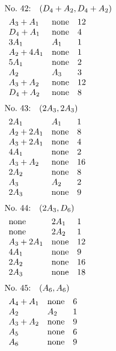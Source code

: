 %
%
\begin{align*}
&\hbox to 4cm {\textrm{No.~42:}\quad$(D_{4}+A_{2}, D_{4}+A_{2})$\hss}\\ 
&\begin{array}{lll}
A_{3}+A_{1} & \none & 12\\
D_{4}+A_{1} & \none & 4\\
3A_{1} & A_{1} & 1\\
A_{2}+4A_{1} & \none & 1\\
5A_{1} & \none & 2\\
A_{2} & A_{3} & 3\\
A_{3}+A_{2} & \none & 12\\
D_{4}+A_{2} & \none & 8\\
\end{array}
\end{align*}
%
%
\begin{align*}
&\hbox to 4cm {\textrm{No.~43:}\quad$(2A_{3}, 2A_{3})$\hss}\\ 
&\begin{array}{lll}
2A_{1} & A_{1} & 1\\
A_{2}+2A_{1} & \none & 8\\
A_{3}+2A_{1} & \none & 4\\
4A_{1} & \none & 2\\
A_{3}+A_{2} & \none & 16\\
2A_{2} & \none & 8\\
A_{3} & A_{2} & 2\\
2A_{3} & \none & 9\\
\end{array}
\end{align*}
%
%
\begin{align*}
&\hbox to 4cm {\textrm{No.~44:}\quad$(2A_{3}, D_{6})$\hss}\\ 
&\begin{array}{lll}
\none & 2A_{1} & 1\\
\none & 2A_{2} & 1\\
A_{3}+2A_{1} & \none & 12\\
4A_{1} & \none & 9\\
2A_{2} & \none & 16\\
2A_{3} & \none & 18\\
\end{array}
\end{align*}
%
%
\begin{align*}
&\hbox to 4cm {\textrm{No.~45:}\quad$(A_{6}, A_{6})$\hss}\\ 
&\begin{array}{lll}
A_{4}+A_{1} & \none & 6\\
A_{2} & A_{2} & 1\\
A_{3}+A_{2} & \none & 9\\
A_{5} & \none & 6\\
A_{6} & \none & 9\\
\end{array}
\end{align*}

